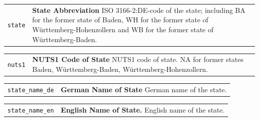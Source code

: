 \documentclass[
]{article}
\begin{document}
\begin{longtable}{p{3.2cm}| p{11cm}}
\texttt{state} &\textbf{State Abbreviation}\newline 
ISO 3166-2:DE-code of the state;
           including BA for the former state of Baden, WH for the former state
           of Württemberg-Hohenzollern and WB for the former state of
           Württemberg-Baden.
\end{longtable}

\begin{longtable}{p{3.2cm}| p{11cm}}
\texttt{nuts1} &\textbf{NUTS1 Code of State}\newline 
NUTS1 code of state. NA for former states Baden, Württemberg-Baden, Württemberg-Hohenzollern.
\end{longtable}

\begin{longtable}{p{3.2cm}| p{11cm}}
\texttt{state\_name\_de} &\textbf{German Name of State}\newline 
German name of the state.
\end{longtable}

\begin{longtable}{p{3.2cm}| p{11cm}}
\texttt{state\_name\_en} &\textbf{English Name of State.}\newline 
English name of the state.
\end{longtable}
\end{document}
